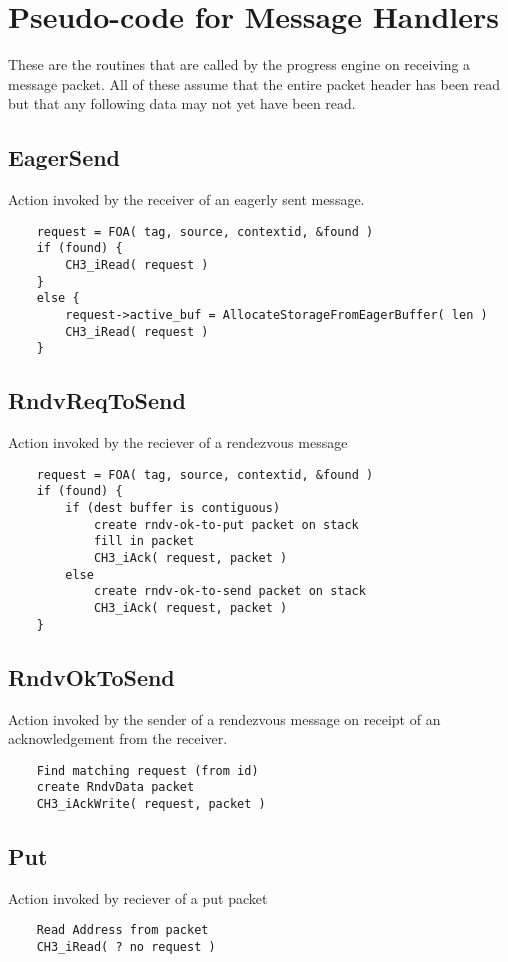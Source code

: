 \documentclass{article}
\begin{document}
\section{Pseudo-code for Message Handlers}
These are the routines that are called by the progress engine on receiving a
message packet.  All of these assume that the entire packet header has been 
read but that any following data may not yet have been read.

\subsection{EagerSend}
Action invoked by the receiver of an eagerly sent message.
\begin{verbatim}
    request = FOA( tag, source, contextid, &found )
    if (found) {
        CH3_iRead( request )
    }
    else {
        request->active_buf = AllocateStorageFromEagerBuffer( len )
        CH3_iRead( request )
    }
\end{verbatim}

\subsection{RndvReqToSend}
Action invoked by the reciever of a rendezvous message
\begin{verbatim}
    request = FOA( tag, source, contextid, &found )
    if (found) {
        if (dest buffer is contiguous)
            create rndv-ok-to-put packet on stack
            fill in packet
            CH3_iAck( request, packet )
        else
            create rndv-ok-to-send packet on stack
            CH3_iAck( request, packet )
    }
\end{verbatim}

\subsection{RndvOkToSend}
Action invoked by the sender of a rendezvous message on receipt of an
acknowledgement from the receiver.
\begin{verbatim}
    Find matching request (from id)
    create RndvData packet
    CH3_iAckWrite( request, packet )
\end{verbatim}

\subsection{Put}
Action invoked by reciever of a put packet
\begin{verbatim}
    Read Address from packet
    CH3_iRead( ? no request )
\end{verbatim}
\end{document}
